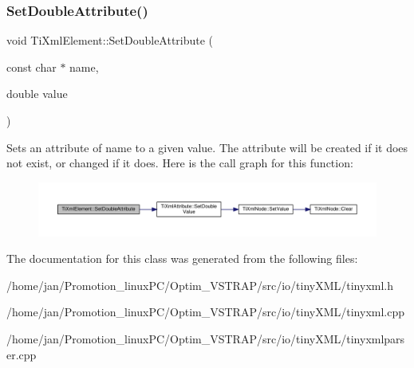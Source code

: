 \subsubsection{\texorpdfstring{Set\+Double\+Attribute()}{SetDoubleAttribute()}}
{\footnotesize\ttfamily void Ti\+Xml\+Element\+::\+Set\+Double\+Attribute (\begin{DoxyParamCaption}\item[{const char $\ast$}]{name,  }\item[{double}]{value }\end{DoxyParamCaption})}

Sets an attribute of name to a given value. The attribute will be created if it does not exist, or changed if it does. Here is the call graph for this function\+:
\nopagebreak
\begin{figure}[H]
\begin{center}
\leavevmode
\includegraphics[width=350pt]{classTiXmlElement_a0d1dd975d75496778177e35abfe0ec0b_cgraph}
\end{center}
\end{figure}


The documentation for this class was generated from the following files\+:\begin{DoxyCompactItemize}
\item 
/home/jan/\+Promotion\+\_\+linux\+P\+C/\+Optim\+\_\+\+V\+S\+T\+R\+A\+P/src/io/tiny\+X\+M\+L/tinyxml.\+h\item 
/home/jan/\+Promotion\+\_\+linux\+P\+C/\+Optim\+\_\+\+V\+S\+T\+R\+A\+P/src/io/tiny\+X\+M\+L/tinyxml.\+cpp\item 
/home/jan/\+Promotion\+\_\+linux\+P\+C/\+Optim\+\_\+\+V\+S\+T\+R\+A\+P/src/io/tiny\+X\+M\+L/tinyxmlparser.\+cpp\end{DoxyCompactItemize}
